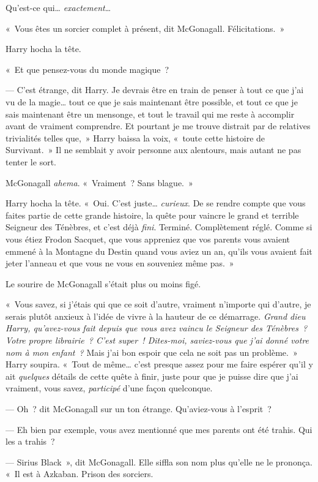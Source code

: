 Qu'est-ce qui… \emph{exactement}…

«~Vous êtes un sorcier complet à présent, dit McGonagall. Félicitations.~»

Harry hocha la tête.

«~Et que pensez-vous du monde magique~?

--- C'est étrange, dit Harry. Je devrais être en train de penser à tout ce que j'ai vu de la magie… tout ce que je sais maintenant être possible, et tout ce que je sais maintenant être un mensonge, et tout le travail qui me reste à accomplir avant de vraiment comprendre. Et pourtant je me trouve distrait par de relatives trivialités telles que,~» Harry baissa la voix, «~toute cette histoire de Survivant.~» Il ne semblait y avoir personne aux alentours, mais autant ne pas tenter le sort.

McGonagall \emph{ahema}. «~Vraiment~? Sans blague.~»

Harry hocha la tête. «~Oui. C'est juste… \emph{curieux}. De se rendre compte que vous faites partie de cette grande histoire, la quête pour vaincre le grand et terrible Seigneur des Ténèbres, et c'est déjà \emph{fini}. Terminé. Complètement réglé. Comme si vous étiez Frodon Sacquet, que vous appreniez que vos parents vous avaient emmené à la Montagne du Destin quand vous aviez un an, qu'ils vous avaient fait jeter l'anneau et que vous ne vous en souveniez même pas.~»

Le sourire de McGonagall s'était plus ou moins figé.

«~Vous savez, si j'étais qui que ce soit d'autre, vraiment n'importe qui d'autre, je serais plutôt anxieux à l'idée de vivre à la hauteur de ce démarrage. \emph{Grand dieu Harry, qu'avez-vous fait depuis que vous avez vaincu le Seigneur des Ténèbres~? Votre propre librairie~? C'est super~! Dites-moi, saviez-vous que j'ai donné votre nom à mon enfant~?} Mais j'ai bon espoir que cela ne soit pas un problème.~» Harry soupira. «~Tout de même… c'est presque assez pour me faire espérer qu'il y ait \emph{quelques} détails de cette quête à finir, juste pour que je puisse dire que j'ai vraiment, vous savez, \emph{participé} d'une façon quelconque.

--- Oh~? dit McGonagall sur un ton étrange. Qu'aviez-vous à l'esprit~?

--- Eh bien par exemple, vous avez mentionné que mes parents ont été trahis. Qui les a trahis~?

--- Sirius Black~», dit McGonagall. Elle siffla son nom plus qu'elle ne le prononça. «~Il est à Azkaban. Prison des sorciers.

